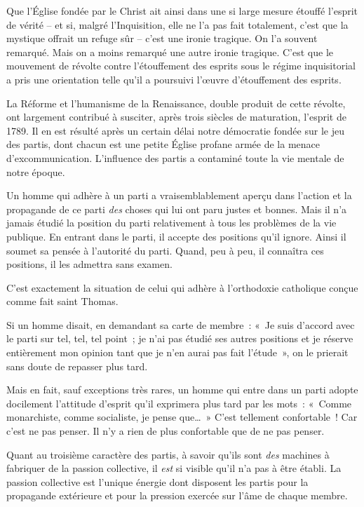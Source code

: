 \documentclass[french,twoside]{book} %
\begin{document}
Que l’Église fondée par le Christ ait ainsi dans une si large mesure étouffé l’esprit de vérité – et si, malgré l’Inquisition, elle ne l’a pas fait totalement, c’est que la mystique offrait un refuge sûr – c’est une ironie tragique. On l’a souvent remarqué. Mais on a moins remarqué une autre ironie tragique. C’est que le mouvement de révolte contre l’étouffement des esprits sous le régime inquisitorial a pris une orientation telle qu’il a poursuivi l’œuvre d’étouffement des esprits.\par
La Réforme et l’humanisme de la Renaissance, double produit de cette révolte, ont largement contribué à susciter, après trois siècles de maturation, l’esprit de 1789. Il en est résulté après un certain délai notre démocratie fondée sur le jeu des partis, dont chacun est une petite Église profane armée de la menace d’excommunication. L’influence des partis a contaminé toute la vie mentale de notre époque.\par
Un homme qui adhère à un parti a vraisemblablement aperçu dans l’action et la propagande de ce parti \emph{des} choses qui lui ont paru justes et bonnes. Mais il n’a jamais étudié la position du parti relativement à tous les problèmes de la vie publique. En entrant dans le parti, il accepte des positions qu’il ignore. Ainsi il soumet sa pensée à l’autorité du parti. Quand, peu à peu, il connaîtra ces positions, il les admettra sans examen.\par
C’est exactement la situation de celui qui adhère à l’orthodoxie catholique conçue comme fait saint Thomas.\par
Si un homme disait, en demandant sa carte de membre : « Je suis d’accord avec le parti sur tel, tel, tel point ; je n’ai pas étudié ses autres positions et je réserve entièrement mon opinion tant que je n’en aurai pas fait l’étude », on le prierait sans doute de repasser plus tard.\par
Mais en fait, sauf exceptions très rares, un homme qui entre dans un parti adopte docilement l’attitude d’esprit qu’il exprimera plus tard par les mots : « Comme monarchiste, comme socialiste, je pense que… » C’est tellement confortable ! Car c’est ne pas penser. Il n’y a rien de plus confortable que de ne pas penser.\par
Quant au troisième caractère des partis, à savoir qu’ils sont \emph{des} machines à fabriquer de la passion collective, il \emph{est} si visible qu’il n’a pas à être établi. La passion collective est l’unique énergie dont disposent les partis pour la propagande extérieure et pour la pression exercée sur l’âme de chaque membre.\par
\end{document}
